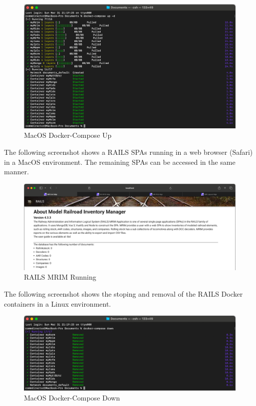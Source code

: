 \begin{figure}[H]
    \centering
    \includegraphics[scale=0.5]{win2m.png}
    \caption{MacOS Docker-Compose Up}
    \label{fig:mac-docker-cmds-2}
\end{figure}
The following screenshot shows a \ac{RAILS} \acp{SPA} running in a web browser (Safari) in a MacOS environment. The remaining \acp{SPA} can be accessed in the same manner.
\begin{figure}[H]
    \centering
    \includegraphics[scale=0.33]{mrimm.png}
    \caption{RAILS MRIM Running}
    \label{fig:rails-mrim}
\end{figure}
The following screenshot shows the stoping and removal of the \ac{RAILS} Docker containers in a Linux environment.
\begin{figure}[H]
    \centering
    \includegraphics[scale=0.5]{win3m.png}
    \caption{MacOS Docker-Compose Down}
    \label{fig:mac-docker-cmds-3}
\end{figure}